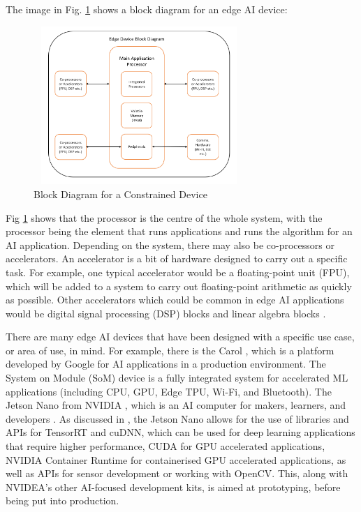 \documentclass[conference]{IEEEtran}
\begin{document}
The image in Fig. \ref{fig:ucblock} shows a block diagram for an edge AI device:    
\begin{figure}[ht]
\includegraphics[width=8cm, height=6cm]{images/edge_device_block_diagram.png}
\centering
\caption{Block Diagram for a Constrained Device}
\label{fig:ucblock}
\end{figure}

Fig \ref{fig:ucblock} shows that the processor is the centre of the whole system, with the processor being the element that runs applications and runs the algorithm for an AI application. Depending on the system, there may also be co-processors or accelerators. An accelerator is a bit of hardware designed to carry out a specific task. For example, one typical accelerator would be a floating-point unit (FPU), which will be added to a system to carry out floating-point arithmetic as quickly as possible. Other accelerators which could be common in edge AI applications would be digital signal processing (DSP) blocks and linear algebra blocks \cite{b4}. 

There are many edge AI devices that have been designed with a specific use case, or area of use, in mind. For example, there is the Carol \cite{b5}, which is a platform developed by Google for AI applications in a production environment. The System on Module (SoM) device is a fully integrated system for accelerated ML applications (including CPU, GPU, Edge TPU, Wi-Fi, and Bluetooth). The Jetson Nano from NVIDIA \cite{b6}, which is an AI computer for makers, learners, and developers \cite{b7}. As discussed in \cite{b7}, the Jetson Nano allows for the use of libraries and APIs for TensorRT and cuDNN, which can be used for deep learning applications that require higher performance, CUDA for GPU accelerated applications, NVIDIA Container Runtime for containerised GPU accelerated applications, as well as APIs for sensor development or working with OpenCV. This, along with NVIDEA's other AI-focused development kits, is aimed at prototyping, before being put into production.
\end{document}

